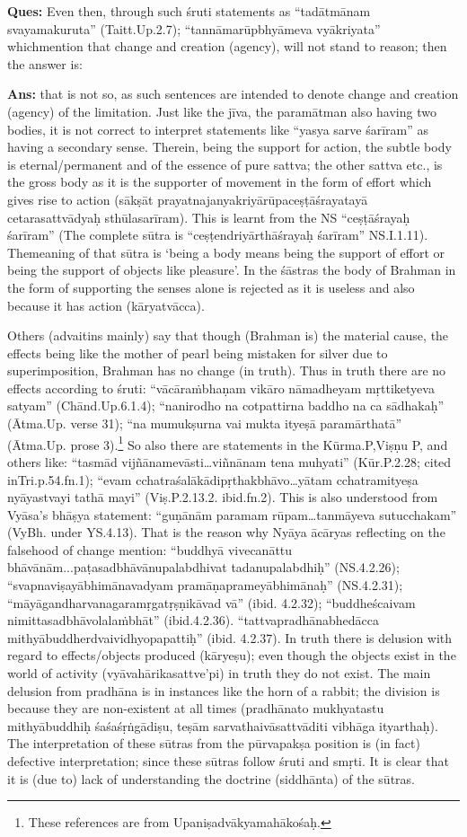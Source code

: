 \textbf{Ques:} Even then, through such śruti statements as “tadātmānam svayamakuruta” (Taitt.Up.2.7); “tannāmarūpbhyāmeva vyākriyata” which\break mention that change and creation (agency), will not stand to reason; then the answer is:

\textbf{Ans:} that is not so, as such sentences are intended to denote change and creation (agency) of the limitation. Just like the jīva, the paramātman also having two bodies, it is not correct to interpret statements like “yasya sarve śarīram” as having a secondary sense. Therein, being the support for action, the subtle body is eternal/permanent and of the essence of pure sattva; the other sattva etc., is the gross body as it is the supporter of movement in the form of effort which gives rise to action (sākṣāt prayatnajanyakriyārūpaceṣṭāśrayatayā cetarasattvādyaḥ sthūlasarīram). This is learnt from the NS “ceṣṭāśrayaḥ śarīram” (The complete sūtra is “ceṣṭendriyārthāśrayaḥ śarīram” NS.I.1.11). The\break meaning of that sūtra is ‘being a body means being the support of effort or being the support of objects like pleasure’. In the śāstras the body of Brahman in the form of supporting the senses alone is rejected as it is useless and also because it has action (kāryatvācca).

Others (advaitins mainly) say that though (Brahman is) the material cause, the effects being like the mother of pearl being mistaken for silver due to superimposition, Brahman has no change (in truth). Thus in truth there are no effects according to śruti: “vācāraṁbhaṇam vikāro nāmadheyam mṛttiketyeva satyam” (Chānd.Up.6.1.4); “nanirodho na cotpattirna baddho na ca sādhakaḥ” (Ātma.Up. verse 31); “na mumukṣurna vai mukta ityeṣā paramārthatā” (Ātma.Up. prose 3).\footnote{These references are from Upaniṣadvākyamahākośaḥ.} So also there are statements in the  Kūrma.P,Viṣṇu P, and others like: “tasmād vijñānamevāsti…viñnānam tena muhyati” (Kūr.P.2.28; cited in\break Tri.p.54.fn.1);  “evam cchatraśalākādipṛthakbhāvo…yātam cchatramityeṣa nyāyastvayi tathā mayi” (Viṣ.P.2.13.2. ibid.fn.2). This is also understood from Vyāsa’s bhāṣya statement: “guṇānām paramam rūpam\-…tanmāyeva sutucchakam” (VyBh. under YS.4.13). That is the reason why Nyāya ācāryas reflecting on the falsehood of change mention: “buddhyā vivecanāttu bhāvānām...paṭasadbhāvānupalabdhivat tadanupalabdhiḥ” (NS.4.2.26); “svapnaviṣayābhimānavadyam pramā\-ṇaprameyābhimānaḥ” (NS.4.2.31); “māyāgandharvanagaramṛgatṛṣṇi\-kāvad vā” (ibid. 4.2.32); “buddheścaivam nimittasadbhāvolalaṁbhāt” (ibid.4.2.36). ``tattvapradhānabhedācca mithyābuddherdvaividhyopapattiḥ'' (ibid. 4.2.37). In truth there is delusion with regard to effects/objects produced (kāryeṣu); even though the objects exist in the world of activity (vyāvahārikasattve’pi) in truth they do not exist. The main delusion from pradhāna is in instances like the horn of a rabbit; the division is because they are non-existent at all times (pradhānato mukhyatastu mithyābuddhiḥ śaśaśṛṅgādiṣu, teṣām sarvathaivāsattvāditi vibhāga ityarthaḥ). The interpretation of these sūtras from the pūrvapakṣa position is (in fact) defective interpretation;  since these sūtras follow śruti and smṛti. It is clear that it is (due to) lack of understanding the doctrine (siddhānta) of the sūtras.

